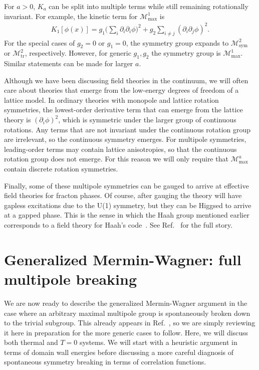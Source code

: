 \documentclass[prb,aps,twocolumn, amsfonts,amsmath,amssymb,nofootinbib,superscriptaddress]{revtex4-2}
\renewcommand{\max}{\text{max}}
\newcommand{\mmax}[1]{\mathcal{M}^{#1}_\max}
\begin{document}
For $a>0$, $K_a$ can be split into multiple terms while still remaining rotationally invariant. For example, the kinetic term for $\mathcal{M}^1_\max$ is 
\begin{align}
K_1[\phi(x)] = g_1 \big(\sum_{i} \partial_i \partial_i \phi\big)^2 + g_2 \sum_{i \ne j} (\partial_i \partial_j \phi)^2.
\end{align}
For the special cases of $g_2=0$ or $g_1=0$, the symmetry group expands to $\mathcal{M}^2_\text{sym}$ or $\mathcal{M}^2_\text{tr}$, respectively. However, for generic $g_1,g_2$ the symmetry group is $\mathcal{M}^1_\max$. Similar statements can be made for larger $a$.

Although we have been discussing field theories in the continuum, we will often care about theories that emerge from the low-energy degrees of freedom of a lattice model. In ordinary theories with monopole and lattice rotation symmetries, the lowest-order derivative term that can emerge from the lattice theory is $(\partial_i \phi)^2$, which is symmetric under the larger group of continuous rotations. Any terms that are not invariant under the continuous rotation group are irrelevant, so the continuous symmetry emerges. For multipole symmetries, leading-order terms may contain lattice anisotropies, so that the continuous rotation group does not emerge. For this reason we will only require that $\mmax{a}$ contain discrete rotation symmetries.

Finally, some of these multipole symmetries can be gauged to arrive at effective field theories for fracton phases. Of course, after gauging the theory will have gapless excitations due to the U(1) symmetry, but they can be Higgsed to arrive at a gapped phase. This is the sense in which the Haah group mentioned earlier corresponds to a field theory for Haah's code~\cite{BB}. See Ref.~\cite{BB, Gromov2019} for the full story. 

\section{Generalized Mermin-Wagner: full multipole breaking}\label{sec:full_breaking}

We are now ready to describe the generalized Mermin-Wagner argument in the case where an arbitrary maximal multipole group is spontaneously broken down to the trivial subgroup. This already appears in Ref.~\cite{Griffin2015}, so we are simply reviewing it here in preparation for the more generic cases to follow. Here, we will discuss both thermal and $T=0$ systems.  We will start with a heuristic argument in terms of domain wall energies before discussing a more careful diagnosis of spontaneous symmetry breaking in terms of correlation functions.
\end{document}

